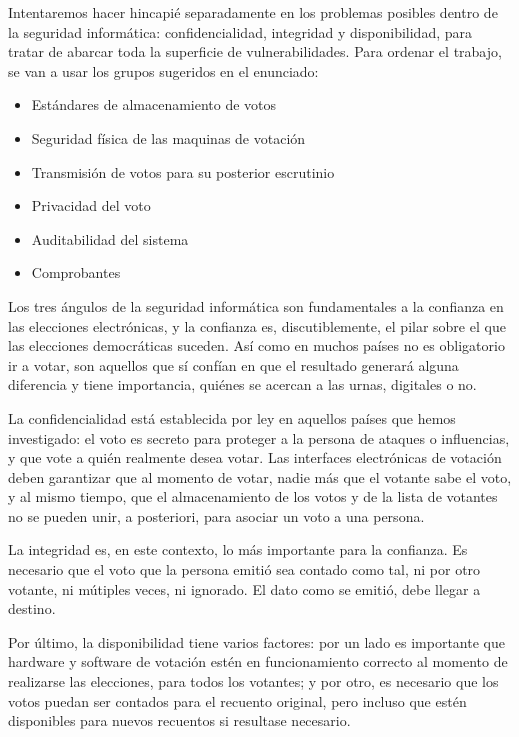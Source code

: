 \documentclass[11pt]{article}
\begin{document}
Intentaremos hacer hincapié separadamente en los problemas posibles dentro de la seguridad informática: confidencialidad, integridad y disponibilidad, para tratar de abarcar toda la superficie de vulnerabilidades. Para ordenar el trabajo, se van a usar los grupos sugeridos en el enunciado:

\begin{itemize}
\item Estándares de almacenamiento de votos
\item Seguridad física de las maquinas de votación
\item Transmisión de votos para su posterior escrutinio
\item Privacidad del voto
\item Auditabilidad del sistema
\item Comprobantes
\end{itemize}

Los tres ángulos de la seguridad informática son fundamentales a la confianza en las elecciones electrónicas, y la confianza es, discutiblemente, el pilar sobre el que las elecciones democráticas suceden. Así como en muchos países no es obligatorio ir a votar, son aquellos que sí confían en que el resultado generará alguna diferencia y tiene importancia, quiénes se acercan a las urnas, digitales o no.

La confidencialidad está establecida por ley en aquellos países que hemos investigado: el voto es secreto para proteger a la persona de ataques o influencias, y que vote a quién realmente desea votar. Las interfaces electrónicas de votación deben garantizar que al momento de votar, nadie más que el votante sabe el voto, y al mismo tiempo, que el almacenamiento de los votos y de la lista de votantes no se pueden unir, a posteriori, para asociar un voto a una persona.

La integridad es, en este contexto, lo más importante para la confianza. Es necesario que el voto que la persona emitió sea contado como tal, ni por otro votante, ni mútiples veces, ni ignorado. El dato como se emitió, debe llegar a destino.

Por último, la disponibilidad tiene varios factores: por un lado es importante que hardware y software de votación estén en funcionamiento correcto al momento de realizarse las elecciones, para todos los votantes; y por otro, es necesario que los votos puedan ser contados para el recuento original, pero incluso que estén disponibles para nuevos recuentos si resultase necesario.
\end{document}

